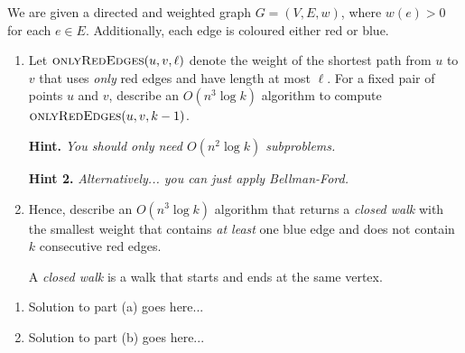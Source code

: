 \documentclass{article}
\begin{document}
\begin{question}
We are given a directed and weighted graph $G = (V, E, w)$, where $w(e) > 0$ for each $e \in E$. Additionally, each edge is coloured either red or blue.

\begin{enumerate}[label = (\alph*)]
    \item Let $\mathsf{\textsc{onlyRedEdges}}(u, v, \ell)$ denote the weight of the shortest path from $u$ to $v$ that uses {\em only} red edges and have length at most $\ell$. For a fixed pair of points $u$ and $v$, describe an $O(n^3 \log k)$ algorithm to compute $\mathsf{\textsc{onlyRedEdges}}(u, v, k - 1)$.

    {\bfseries Hint.} {\em You should only need $O(n^2 \log k)$ subproblems.}

    {\bfseries Hint 2.} {\em Alternatively... you can just apply Bellman-Ford.}

    \item Hence, describe an $O(n^3 \log k)$ algorithm that returns a {\em closed walk} with the smallest weight that contains {\em at least} one blue edge and does not contain $k$ consecutive red edges.

    A {\em closed walk} is a walk that starts and ends at the same vertex.
\end{enumerate}
\end{question}

\begin{solution}
\begin{enumerate}[label = (\alph*)]
    \item Solution to part (a) goes here...

    \item Solution to part (b) goes here...
\end{enumerate}
\end{solution}
\end{document}
